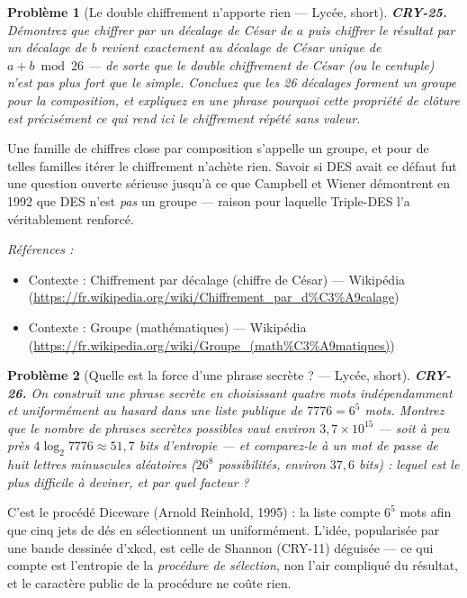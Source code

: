 \documentclass[11pt]{article}
\newtheorem{problem}{Problème}
\newenvironment{refs}{\par\small\noindent\emph{Références :}\begin{itemize}\setlength\itemsep{0pt}}{\end{itemize}\normalsize}
\begin{document}
\bigskip

\begin{problem}[{Le double chiffrement n'apporte rien --- Lycée, short}]
\textbf{CRY-25.} Démontrez que chiffrer par un décalage de César de
$a$ puis chiffrer le résultat par un décalage de $b$ revient exactement au décalage de
César unique de $a + b \bmod 26$ --- de sorte que le double chiffrement de César (ou le
centuple) n'est pas plus fort que le simple. Concluez que les 26 décalages forment un groupe
pour la composition, et expliquez en une phrase pourquoi cette propriété de clôture est
précisément ce qui rend ici le chiffrement répété sans valeur.
\end{problem}

\noindent Une famille de chiffres close par composition s'appelle un groupe, et pour
de telles familles itérer le chiffrement n'achète rien. Savoir si DES avait ce défaut fut une
question ouverte sérieuse jusqu'à ce que Campbell et Wiener démontrent en 1992 que DES n'est
\textit{pas} un groupe --- raison pour laquelle Triple-DES l'a véritablement renforcé.

\begin{refs}
\item Contexte : Chiffrement par décalage (chiffre de César) --- Wikipédia (\url{https://fr.wikipedia.org/wiki/Chiffrement_par_d%C3%A9calage})
\item Contexte : Groupe (mathématiques) --- Wikipédia (\url{https://fr.wikipedia.org/wiki/Groupe_(math%C3%A9matiques)})
\end{refs}

\bigskip

\begin{problem}[{Quelle est la force d'une phrase secrète ? --- Lycée, short}]
\textbf{CRY-26.} On construit une phrase secrète en choisissant quatre
mots indépendamment et uniformément au hasard dans une liste publique de $7776 = 6^5$ mots.
Montrez que le nombre de phrases secrètes possibles vaut environ $3{,}7 \times 10^{15}$ ---
soit à peu près $4\log_2 7776 \approx 51{,}7$ bits d'entropie --- et comparez-le à un mot de
passe de huit lettres minuscules aléatoires ($26^8$ possibilités, environ
$37{,}6$ bits) : lequel est le plus difficile à deviner, et par quel facteur ?
\end{problem}

\noindent C'est le procédé Diceware (Arnold Reinhold, 1995) : la liste compte
$6^5$ mots afin que cinq jets de dés en sélectionnent un uniformément. L'idée, popularisée
par une bande dessinée d'xkcd, est celle de Shannon (CRY-11) déguisée --- ce qui compte est
l'entropie de la \textit{procédure de sélection}, non l'air compliqué du résultat, et le
caractère public de la procédure ne coûte rien.
\end{document}
